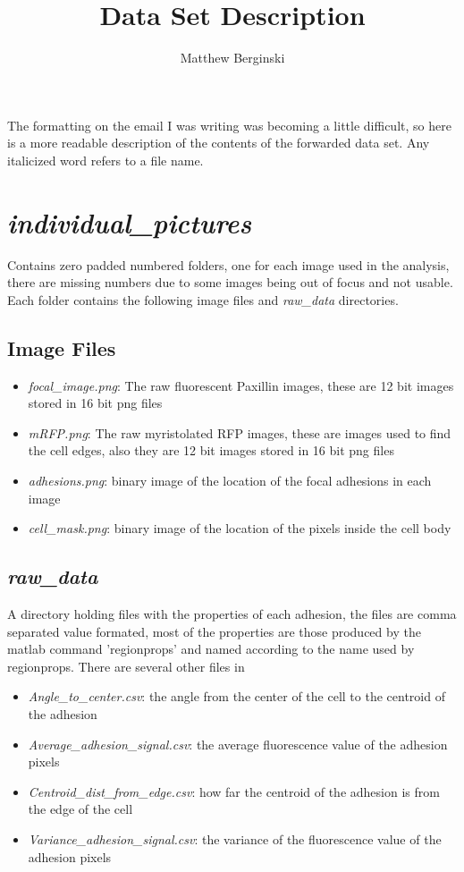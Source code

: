 \documentclass[letterpaper]{article}
\title{Data Set Description}
\author{Matthew Berginski}
\begin{document}
\maketitle

The formatting on the email I was writing was becoming a little difficult, so here is a more readable description of the contents of the forwarded data set. Any italicized word refers to a file name.

\section*{\emph{individual\_pictures}}
Contains zero padded numbered folders, one for each image used in the analysis, there are missing numbers due to some images being out of focus and not usable. Each folder contains the following image files and \emph{raw\_data} directories.
\subsection*{Image Files}
	\begin{itemize}
	\item \emph{focal\_image.png}: The raw fluorescent Paxillin images, these are 12 bit images stored in 16 bit png files
	\item \emph{mRFP.png}: The raw myristolated RFP images, these are images used to find the cell edges, also they are 12 bit images stored in 16 bit png files
	\item \emph{adhesions.png}: binary image of the location of the focal adhesions in each image
       \item \emph{cell\_mask.png}: binary image of the location of the pixels inside the cell body
	\end{itemize}

\subsection*{\emph{raw\_data}}
A directory holding files with the properties of each adhesion, the files are comma separated value formated, most of the properties are those produced by the matlab command 'regionprops' and named according to the name used by regionprops. There are several other files in 
	\begin{itemize}
       \item \emph{Angle\_to\_center.csv}: the angle from the center of the cell to the centroid of the adhesion
       \item \emph{Average\_adhesion\_signal.csv}: the average fluorescence value of the adhesion pixels
       \item \emph{Centroid\_dist\_from\_edge.csv}: how far the centroid of the adhesion is from the edge of the cell
       \item \emph{Variance\_adhesion\_signal.csv}: the variance of the fluorescence value of the adhesion pixels
	\end{itemize}
\end{document}
